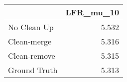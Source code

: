 \begin{tabular}{lr}
\toprule
{} & LFR_mu_10 \\
\midrule
No Clean Up  &     5.532 \\
Clean-merge  &     5.316 \\
Clean-remove &     5.315 \\
Ground Truth &     5.313 \\
\bottomrule
\end{tabular}
